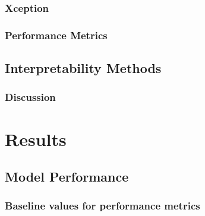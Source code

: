 \documentclass[biblatexBackend=bibtex]{tumthesis}
\begin{document}
\subsection{Xception}
\label{sec:methodology:XC}


\subsection{Performance Metrics}
\label{sec:methodology:metrics}


\section{Interpretability Methods}
\label{sec:methodology:interpretability_methods}



\subsection{Discussion}
\label{sec:methodology:discussion}


\chapter{Results}
\label{ch:results}


\section{Model Performance}
\label{sec:model_performance}


\subsection{Baseline values for performance metrics}
\label{sec:results:bl_values}

\end{document}
